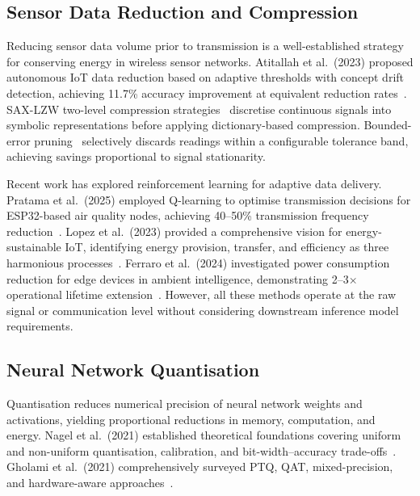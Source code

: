 \subsection{Sensor Data Reduction and Compression}
\label{sec:rw_compression}

Reducing sensor data volume prior to transmission is a well-established strategy for conserving energy in wireless sensor networks. Atitallah et al.~(2023) proposed autonomous IoT data reduction based on adaptive thresholds with concept drift detection, achieving 11.7\% accuracy improvement at equivalent reduction rates~\cite{atitallah2023autonomous}. SAX-LZW two-level compression strategies~\cite{aljanabi2022sax} discretise continuous signals into symbolic representations before applying dictionary-based compression. Bounded-error pruning~\cite{azar2020bounded} selectively discards readings within a configurable tolerance band, achieving savings proportional to signal stationarity.

Recent work has explored reinforcement learning for adaptive data delivery. Pratama et al.~(2025) employed Q-learning to optimise transmission decisions for ESP32-based air quality nodes, achieving 40--50\% transmission frequency reduction~\cite{qlearning2025airquality}. Lopez et al.~(2023) provided a comprehensive vision for energy-sustainable IoT, identifying energy provision, transfer, and efficiency as three harmonious processes~\cite{energysustainable2023}. Ferraro et al.~(2024) investigated power consumption reduction for edge devices in ambient intelligence, demonstrating 2--3$\times$ operational lifetime extension~\cite{reducingpower2024}. However, all these methods operate at the raw signal or communication level without considering downstream inference model requirements.

\subsection{Neural Network Quantisation}
\label{sec:rw_quantisation}

Quantisation reduces numerical precision of neural network weights and activations, yielding proportional reductions in memory, computation, and energy. Nagel et al.~(2021) established theoretical foundations covering uniform and non-uniform quantisation, calibration, and bit-width--accuracy trade-offs~\cite{nagel2021whitepaper}. Gholami et al.~(2021) comprehensively surveyed PTQ, QAT, mixed-precision, and hardware-aware approaches~\cite{quantsurvey2021}.

